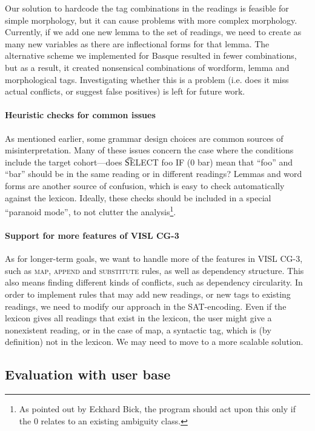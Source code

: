 {{Our solution to hardcode the tag combinations in the readings is
feasible for simple morphology, but it can cause problems with more
complex morphology. Currently, if we add one new lemma to the set of
readings, we need to create as many new variables as there are
inflectional forms for that lemma.  The alternative scheme we
implemented for Basque resulted in fewer combinations, but as a
result, it created nonsensical combinations of wordform, lemma and
morphological tags. Investigating whether this is a problem (i.e. does
it miss actual conflicts, or suggest false positives) is left for
future work.


\paragraph{Heuristic checks for common issues}
As mentioned earlier, some grammar design choices are common sources
of misinterpretation.  Many of these issues concern the case where the
conditions include the target cohort---does \t{SELECT foo IF (0 bar)}
mean that ``foo'' and ``bar'' should be in the same reading or in
different readings?  Lemmas and word forms are another source of
confusion, which is easy to check automatically against the lexicon.
Ideally, these checks should be included in a special ``paranoid
mode'', to not clutter the analysis\footnote{As pointed out by Eckhard
  Bick, the program should act upon this only if the 0 relates to an
  existing ambiguity class.}.


\paragraph{Support for more features of VISL CG-3}
As for longer-term goals, we want to handle more of the features in
VISL CG-3, such as \textsc{map}, \textsc{append} and
\textsc{substitute} rules, as well as dependency structure.  This also
means finding different kinds of conflicts, such as dependency
circularity.  In order to implement rules that may add new readings,
or new tags to existing readings, we need to modify our approach in
the SAT-encoding.  Even if the lexicon gives all readings that exist
in the lexicon, the user might give a nonexistent reading, or in the
case of {\sc map}, a syntactic tag, which is (by definition) not in
the lexicon. We may need to move to a more scalable solution.

\subsection{Evaluation with user base}

}}
